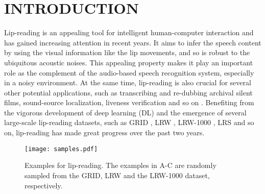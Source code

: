 \documentclass[a4paper, 10pt, conference]{ieeeconf}      \usepackage{FG2020}
\begin{document}
\section{INTRODUCTION}
Lip-reading is an appealing tool for intelligent human-computer interaction and has gained increasing attention in recent years. It aims to infer the speech content by using the visual information \cite{B2017} like the lip movements, and so is robust to the ubiquitous acoustic noises. This appealing property makes it play an important role as the complement of the audio-based speech recognition system, especially in a noisy environment. At the same time, lip-reading is also crucial for several other potential applications, such as transcribing and re-dubbing archival silent films, sound-source localization, liveness verification and so on \cite{Chung}.
Benefiting from the vigorous development of deep learning (DL) and the emergence of several large-scale lip-reading datasets, such as GRID \cite{cooke2006}, LRW \cite{B2017}, LRW-1000 \cite{Yang2019}, LRS \cite{Chung} and so on, lip-reading has made great progress over the past two years.
	
\begin{figure}
	\setlength{\abovecaptionskip}{0.0cm}
	\setlength{\belowcaptionskip}{-0.2cm} 
	\centering
\texttt{[image: samples.pdf]}
	\caption{Examples for lip-reading. The examples in A-C are randomly sampled from the GRID, LRW and the LRW-1000 dataset, respectively.}
	\label{samples}
\end{figure}
\end{document}
